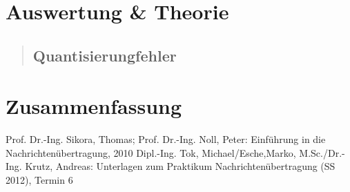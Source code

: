 \section{Auswertung \& Theorie}
\begin{quote}
    
    \subsection{}
    
    \begin{quote}
        
    
    
    \end{quote}
    
    
    \subsection{Quantisierungfehler}
    
    \begin{quote}
        
    \end{quote}    
    
\end{quote}

\section{Zusammenfassung}
\begin{quote}
	
 
    
\end{quote} %


\begin{thebibliography}{999}




 Prof. Dr.-Ing. Sikora, Thomas; Prof. Dr.-Ing. Noll, Peter: Einführung in die
Nachrichtenübertragung, 2010
 Dipl.-Ing. Tok, Michael/Esche,Marko, M.Sc./Dr.-Ing. Krutz, Andreas: Unterlagen zum Praktikum
Nachrichtenübertragung (SS 2012), Termin 6
\end{thebibliography}

